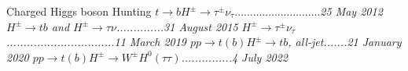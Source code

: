\begin{MyArticle}[enhanced, tikz={rotate=0}]{Charged Higgs boson
    Hunting}
  $t\rightarrow bH^{\pm}\rightarrow \tau^{\pm} \nu_{\tau}$............................\it{25 May 2012}\newline
  $H^{\pm}\rightarrow tb$ and $H^{\pm}\rightarrow \tau\nu$..............\it{31 August 2015}\newline
  $H^{\pm} \rightarrow \tau^{\pm} \nu_{\tau}$ ................................\it{11 March 2019}\newline
  $pp\rightarrow t(b)H^{\pm} \rightarrow tb$, all-jet.......\it{21 January 2020}\newline
  $pp\rightarrow t(b)H^{\pm} \rightarrow W^{\pm}H^{0}(\tau\tau)$...............\it{4 July 2022}
\end{MyArticle}
